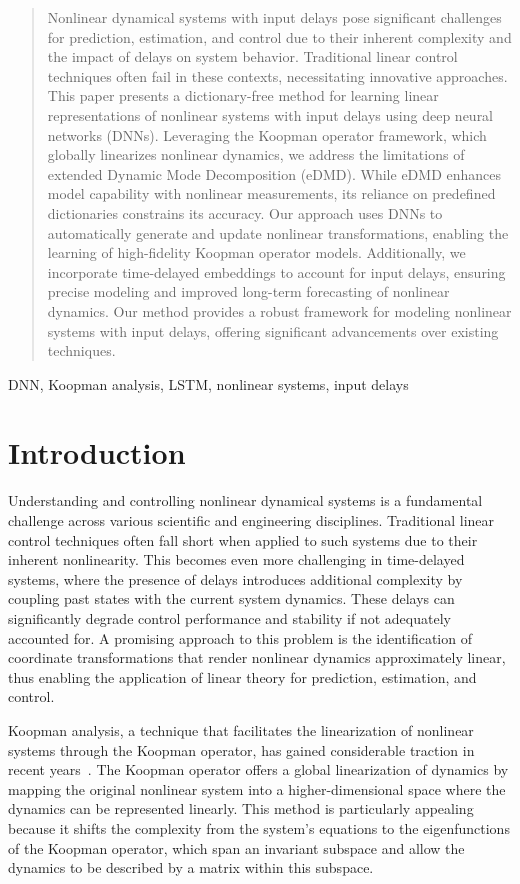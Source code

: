 \documentclass[conference]{IEEEtran}
\begin{document}
\begin{abstract}
    Nonlinear dynamical systems with input delays pose significant challenges for prediction, estimation, and control due to their inherent complexity and the impact of delays on system behavior. Traditional linear control techniques often fail in these contexts, necessitating innovative approaches. This paper presents a dictionary-free method for learning linear representations of nonlinear systems with input delays using deep neural networks (DNNs). Leveraging the Koopman operator framework, which globally linearizes nonlinear dynamics, we address the limitations of extended Dynamic Mode Decomposition (eDMD). While eDMD enhances model capability with nonlinear measurements, its reliance on predefined dictionaries constrains its accuracy. Our approach uses DNNs to automatically generate and update nonlinear transformations, enabling the learning of high-fidelity Koopman operator models. Additionally, we incorporate time-delayed embeddings to account for input delays, ensuring precise modeling and improved long-term forecasting of nonlinear dynamics. Our method provides a robust framework for modeling nonlinear systems with input delays, offering significant advancements over existing techniques.
\end{abstract}

\begin{IEEEkeywords}
    DNN, Koopman analysis, LSTM, nonlinear systems, input delays
\end{IEEEkeywords}

\section{Introduction}
Understanding and controlling nonlinear dynamical systems is a fundamental challenge across various scientific and engineering disciplines. Traditional linear control techniques often fall short when applied to such systems due to their inherent nonlinearity. This becomes even more challenging in time-delayed systems, where the presence of delays introduces additional complexity by coupling past states with the current system dynamics. These delays can significantly degrade control performance and stability if not adequately accounted for. A promising approach to this problem is the identification of coordinate transformations that render nonlinear dynamics approximately linear, thus enabling the application of linear theory for prediction, estimation, and control.

Koopman analysis, a technique that facilitates the linearization of nonlinear systems through the Koopman operator, has gained considerable traction in recent years~\cite{Mezic2004101, Mezić2005}. The Koopman operator offers a global linearization of dynamics by mapping the original nonlinear system into a higher-dimensional space where the dynamics can be represented linearly. This method is particularly appealing because it shifts the complexity from the system's equations to the eigenfunctions of the Koopman operator, which span an invariant subspace and allow the dynamics to be described by a matrix within this subspace.
\end{document}
